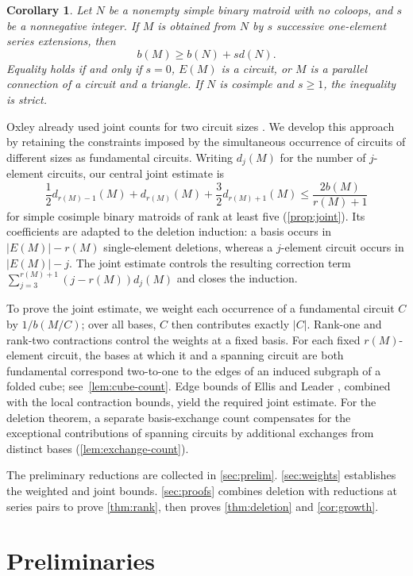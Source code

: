 \documentclass[11pt]{article}
\numberwithin{equation}{section}
\newtheorem{corollary}[corollary]{Corollary}
\begin{document}
\begin{corollary}\label{cor:growth}
Let \(N\) be a nonempty simple binary matroid with no coloops, and \(s\) be a nonnegative integer.
If \(M\) is obtained from \(N\) by \(s\) successive one-element
series extensions, then
\[
 b(M)\ge b(N)+s d(N).
\]
Equality holds if and only if \(s=0\), \(E(M)\) is a circuit, or
\(M\) is a parallel connection of a circuit and a triangle.
If \(N\) is cosimple and \(s\ge1\), the inequality is strict.
\end{corollary}

Oxley already used joint counts for two circuit sizes
\cite[proof of Lemma~2.11]{Oxley1983}.
We develop this approach by retaining the constraints imposed by the
simultaneous occurrence of circuits of different sizes as fundamental
circuits. Writing \(d_j(M)\) for the number of \(j\)-element circuits,
our central joint estimate is
\[
 \frac12d_{r(M)-1}(M)+d_{r(M)}(M)+\frac32d_{r(M)+1}(M)
 \le\frac{2b(M)}{r(M)+1}
\]
for simple cosimple binary matroids of rank at least five
(\autoref{prop:joint}). Its coefficients are adapted to the deletion
induction: a basis occurs in \(|E(M)|-r(M)\) single-element deletions,
whereas a \(j\)-element circuit occurs in \(|E(M)|-j\).
The joint estimate controls the resulting correction term
\(\sum_{j=3}^{r(M)+1}(j-r(M))d_j(M)\) and closes the induction.

To prove the joint estimate, we weight each occurrence of a fundamental
circuit \(C\) by \(1/b(M/C)\); over all bases, \(C\) then contributes
exactly \(|C|\). Rank-one and rank-two contractions control the weights
at a fixed basis. For each fixed \(r(M)\)-element circuit, the bases
at which it and a spanning circuit are both fundamental correspond
two-to-one to the edges of an induced subgraph of a folded cube;
see~\autoref{lem:cube-count}. Edge bounds of Ellis and Leader
\cite{EllisLeader2018}, combined with the local contraction bounds,
yield the required joint estimate.
For the deletion theorem, a separate basis-exchange count compensates
for the exceptional contributions of spanning circuits by additional
exchanges from distinct bases (\autoref{lem:exchange-count}).

The preliminary reductions are collected in \autoref{sec:prelim}.
\autoref{sec:weights} establishes the weighted and joint bounds.
\autoref{sec:proofs} combines deletion with reductions at series pairs
to prove \autoref{thm:rank}, then proves \autoref{thm:deletion}
and \autoref{cor:growth}.

\section{Preliminaries}\label{sec:prelim}
\end{document}
